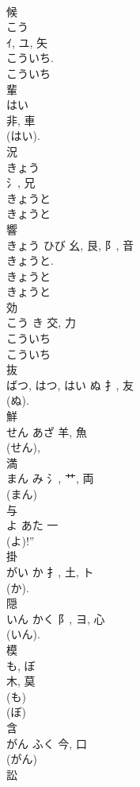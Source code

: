 \documentclass[8pt]{extreport}
\begin{document}
\begin{CJK}{UTF8}{min}
\\	候	
\\	こう	
\\	ｲ, ユ, 矢		
\\	こういち.	
\\	こういち 
\\	輩	
\\	はい	
\\	非, 車	
\\	(はい). 
\\	況	
\\	きょう	
\\	氵, 兄	
\\	きょうと 
\\	きょうと 
\\	響	
\\	きょう	ひび	幺, 艮, 阝, 音	
\\	きょうと. 
\\	きょうと 
\\	きょうと 
\\	効	
\\	こう	き	交, 力	
\\	こういち
\\	こういち
\\	抜	
\\	ばつ, はつ, はい	ぬ	扌, 友	
\\	(ぬ). 
\\	鮮	
\\	せん	あざ	羊, 魚	
\\	(せん), 
\\	満	
\\	まん	み	氵, 艹, 両	
\\	(まん) 
\\	与	
\\	よ	あた	一		
\\	(よ)!” 
\\	掛	
\\	がい	か	扌, 土, ト	
\\	(か). 
\\	隠	
\\	いん	かく	阝, ヨ, 心		
\\	(いん).	
\\	模	
\\	も, ぼ	
\\	木, 莫	
\\	(も) 
\\	(ぼ) 
\\	含	
\\	がん	ふく	今, 口	
\\	(がん) 
\\	訟	

\end{CJK}
\end{document}
